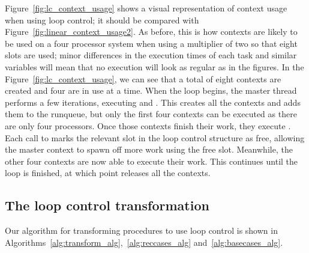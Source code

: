 Figure~\ref{fig:lc_context_usage} shows a visual representation of context
usage when using loop control;
it should be compared with Figure~\ref{fig:linear_context_usage2}.
As before, this is how contexts are likely to be used on a four processor
system
when using a multiplier of two so that eight slots are used;
minor differences in the execution times of each task and similar variables
will mean that no execution will look as regular as in the figures.
In the Figure~\ref{fig:lc_context_usage},
we can see that a total of eight contexts are created and four are in use at
a time.
When the loop begins,
the master thread performs a few iterations, executing \lcwaitfreeslot and
\lcspawnoff.
This creates all the contexts and  adds them to the runqueue,
but only the first four contexts can be executed as there are only four
processors.
Once those contexts finish their work,
they execute \lcjoinandterminate.
Each call to \lcjoinandterminate marks the relevant slot in the loop control
structure as free,
allowing the master context to spawn off more work using the free slot.
Meanwhile, the other four contexts are now able to execute their work.
This continues until the loop is finished, at which point \lcfinish releases
all the contexts.

\subsection{The loop control transformation}
\label{sec:lc_trans}

Our algorithm for transforming procedures to use loop control
is shown in
Algorithms~\ref{alg:transform_alg},~\ref{alg:reccases_alg} and~\ref{alg:basecases_alg}.

